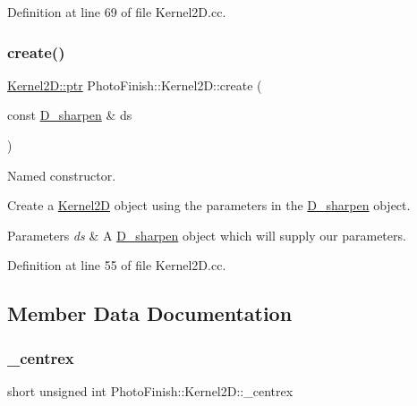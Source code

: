 Definition at line 69 of file Kernel2\+D.\+cc.

\mbox{\label{class_photo_finish_1_1_kernel2_d_a1b28832e16ba150a49138caef3f4f918}} 
\subsubsection{\texorpdfstring{create()}{create()}}
{\footnotesize\ttfamily \hyperlink{class_photo_finish_1_1_kernel2_d_a7a209c34b3c8edb54835f1bab1244970}{Kernel2\+D\+::ptr} Photo\+Finish\+::\+Kernel2\+D\+::create (\begin{DoxyParamCaption}\item[{const \hyperlink{class_photo_finish_1_1_d__sharpen}{D\+\_\+sharpen} \&}]{ds }\end{DoxyParamCaption})\hspace{0.3cm}{\ttfamily [static]}}



Named constructor. 

Create a \hyperlink{class_photo_finish_1_1_kernel2_d}{Kernel2D} object using the parameters in the \hyperlink{class_photo_finish_1_1_d__sharpen}{D\+\_\+sharpen} object. 
\begin{DoxyParams}{Parameters}
{\em ds} & A \hyperlink{class_photo_finish_1_1_d__sharpen}{D\+\_\+sharpen} object which will supply our parameters. \\
\hline
\end{DoxyParams}


Definition at line 55 of file Kernel2\+D.\+cc.



\subsection{Member Data Documentation}
\mbox{\label{class_photo_finish_1_1_kernel2_d_a184056430bd255f5ce75c67571304459}} 
\subsubsection{\texorpdfstring{\+\_\+centrex}{\_centrex}}
{\footnotesize\ttfamily short unsigned int Photo\+Finish\+::\+Kernel2\+D\+::\+\_\+centrex\hspace{0.3cm}{\ttfamily [protected]}}



